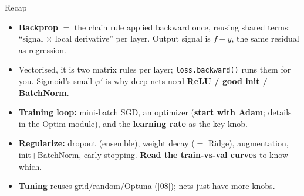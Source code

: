 \documentclass[aspectratio=169]{beamer}
\begin{document}
\begin{frame}{Recap}
  \begin{itemize}\small
    \item \textbf{Backprop} $=$ the chain rule applied backward once, reusing shared terms:
      ``signal $\times$ local derivative'' per layer. Output signal is $f-y$, the same residual
      as regression.
    \item Vectorised, it is two matrix rules per layer; \texttt{loss.backward()} runs them for
      you. Sigmoid's small $\varphi'$ is why deep nets need \textbf{ReLU / good init / BatchNorm}.
    \item \textbf{Training loop:} mini-batch SGD, an optimizer (\textbf{start with Adam};
      details in the Optim module), and the \textbf{learning rate} as the key knob.
    \item \textbf{Regularize:} dropout (ensemble), weight decay ($=$ Ridge), augmentation,
      init$+$BatchNorm, early stopping. \textbf{Read the train-vs-val curves} to know which.
    \item \textbf{Tuning} reuses grid/random/Optuna ([08]); nets just have more knobs.
  \end{itemize}
  \vfill
\end{frame}
\end{document}

